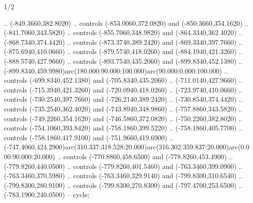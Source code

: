 \begin{flagdescription}{1/2}
\begin{scope}[xshift=\flaglength/6,yshift=0.525\flagwidth,scale=0.002929\flagwidth]
\begin{scope}[y=0.1pt, x=0.1pt, yscale=-1,cm={{1.42,0.0,0.0,1.42,(1136,-1618)}},fill=gold]
  .. (-849.3660,382.8020) .. controls (-853.0060,372.0820) and
  (-850.3660,354.1620) .. (-841.7060,343.5820) .. controls (-855.7060,348.9820)
  and (-864.3340,362.4020) .. (-868.7340,374.4420) .. controls
  (-873.3740,389.2420) and (-869.3340,397.7660) .. (-875.6940,410.0660) ..
  controls (-879.5740,418.0260) and (-884.1940,421.3260) .. (-888.5740,427.9660)
  .. controls (-893.7540,435.2060) and (-899.8340,452.1380) ..
  (-899.8340,459.9980)arc(180.000:90.000:100.000)arc(90.000:0.000:100.000) ..
  controls (-699.8340,452.1380) and (-705.8340,435.2060) .. (-711.0140,427.9660)
  .. controls (-715.3940,421.3260) and (-720.0940,418.0260) ..
  (-723.9740,410.0660) .. controls (-730.2540,397.7660) and (-726.2140,389.2420)
  .. (-730.8540,374.4420) .. controls (-735.2540,362.4020) and
  (-743.8940,348.9860) .. (-757.8860,343.5820) .. controls (-749.2260,354.1620)
  and (-746.5860,372.0820) .. (-750.2260,382.8020) .. controls
  (-754.1060,393.8420) and (-758.1860,399.5220) .. (-758.1860,405.7700) ..
  controls (-758.1860,417.9100) and (-751.9660,419.6900) ..
  (-747.4060,424.2900)arc(310.337:318.528:20.000)arc(316.302:359.837:20.000)arc(0.000:90.000:20.000)
  .. controls (-770.8860,458.6500) and (-778.8260,453.4900) ..
  (-779.8260,440.0500) .. controls (-779.8260,401.5460) and (-763.3460,399.0900)
  .. (-763.3460,370.5980) .. controls (-763.3460,329.9140) and
  (-799.8300,310.6540) .. (-799.8300,280.9100) .. controls (-799.8300,270.8300)
  and (-797.4700,253.6500) .. (-783.1900,240.0500) -- cycle;
\end{scope}
\end{scope}\fi
\framecode{}
\end{flagdescription}
